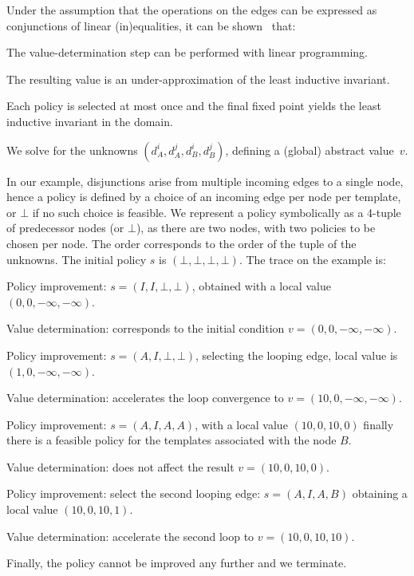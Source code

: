 \documentclass{llncs}
\begin{document}
Under the
assumption that the operations on the edges can be expressed as conjunctions of
linear (in)equalities,
it can be shown~\cite{max_strategy_templates} that:
\begin{inparaenum}[(i)]
\item The value-determination step can be performed with linear programming.
\item The resulting value is an under-approximation of the least inductive
    invariant.
\item Each policy is selected at most once and
    the final fixed point yields the least inductive invariant in the domain.
\end{inparaenum}

\begin{example}
We solve for the unknowns $(d^i_A, d^j_A, d^i_B, d^j_B)$, defining a (global) abstract value~$v$.

In our example, disjunctions arise from multiple
incoming edges to a single node, hence a policy is defined by a choice of an incoming
edge per node per template, or $\bot$ if no such choice is feasible.
We represent a policy symbolically as a 4-tuple of predecessor nodes (or $\bot$),
as there are two nodes, with two policies to be chosen per node.
The order corresponds to the order of the tuple of the unknowns.
The initial policy $s$ is $(\bot, \bot, \bot, \bot)$.
The trace on the example is:
    \begin{compactenum}
        \item Policy improvement: $s = (I, I, \bot, \bot)$, obtained with a
            local value $(0, 0, -\infty, -\infty)$.
        \item Value determination: corresponds to the initial condition 
            $v = (0, 0, -\infty, -\infty)$.
        \item Policy improvement: $s = (A, I, \bot, \bot)$, selecting the
            looping edge, local value is $(1, 0, -\infty, -\infty)$.
        \item Value determination: accelerates the loop convergence to
            $v = (10, 0, -\infty, -\infty)$.
        \item Policy improvement: $s = (A, I, A, A)$, with a local value $(10,
            0, 10, 0)$ finally there is a
            feasible policy for the templates associated with the node $B$.
        \item Value determination: does not affect the result $v = (10,
            0, 10, 0)$.
        \item Policy improvement: select the second looping edge: $s = (A, I, A,
            B)$ obtaining a local value $(10, 0, 10, 1)$.
        \item Value determination: accelerate the second loop to $v = (10, 0, 10,
            10)$.
        \item Finally, the policy cannot be improved any further and we terminate.
    \end{compactenum}


\end{example}
\end{document}
